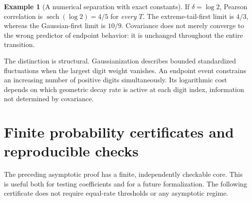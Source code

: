 \documentclass[11pt,a4paper]{article}
\theoremstyle{definition}
\newtheorem{example}[theorem]{Example}
\theoremstyle{remark}
\newcommand{\sech}{\operatorname{sech}}
\numberwithin{equation}{section}
\begin{document}
\begin{example}[A numerical separation with exact constants]
If $\delta=\log2$, Pearson correlation is $\sech(\log2)=4/5$ for
\emph{every} $T$. The extreme-tail-first limit is $4/3$, whereas the
Gaussian-first limit is $10/9$. Covariance does not merely converge to the
wrong predictor of endpoint behavior: it is unchanged throughout the
entire transition.
\end{example}

The distinction is structural. Gaussianization describes bounded
standardized fluctuations when the largest digit weight vanishes.
An endpoint event constrains an increasing number of positive digits
simultaneously. Its logarithmic cost depends on which geometric decay rate
is active at each digit index, information not determined by covariance.

\section{Finite probability certificates and reproducible checks}
\label{sec:certificates}

The preceding asymptotic proof has a finite, independently checkable core.
This is useful both for testing coefficients and for a future formalization.
The following certificate does not require equal-rate thresholds or any
asymptotic regime.
\end{document}
